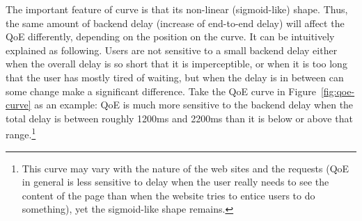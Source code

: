 The important feature of curve is that its non-linear (sigmoid-like) shape.
Thus, the same amount of backend delay (\ie increase of end-to-end delay) will affect the QoE differently, depending on the position on the curve.
It can be intuitively explained as following.
Users are not sensitive to a small backend delay either when the overall delay is so short that it is imperceptible, or when it is too long that the user has mostly tired of waiting, but when the delay is in between can some change make a significant difference. 
Take the QoE curve in Figure~\ref{fig:qoe-curve} as an example: QoE is much more sensitive to the backend delay when the total delay is between roughly 1200ms and 2200ms than it is below or above that range.\footnote{This curve may vary with the nature of the web sites and the requests (\eg QoE in general is less sensitive to delay when the user really needs to see the content of the page than when the website tries to entice users to do something), yet the sigmoid-like shape remains.}




